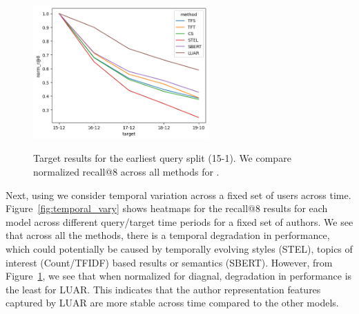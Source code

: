 \begin{figure}
    \centering
    \includegraphics[width=0.6\textwidth,alt={Line plot showing normalized decay across methods.}]{stylometryExtensions/figures/luar_degradation.png}
    \caption{Target results for the earliest query split (15-1). We compare normalized recall@8 across all methods for \DSvarydelta{}.}
    \label{fig:temporal_vary:line}
\end{figure}

Next, using \DSvarydelta{} we consider temporal variation across a fixed set of users across time.
Figure~\ref{fig:temporal_vary} shows heatmaps for the recall@8 results for each model across different query/target time periods for a fixed set of authors.
We see that across all the methods, there is a temporal degradation in performance, which could potentially be caused by temporally evolving styles (STEL), topics of interest (Count/TFIDF) based results or semantics (SBERT).
However, from Figure~\ref{fig:temporal_vary:line}, we see that when normalized for diagnal, degradation in performance is the least for LUAR.
This indicates that the author representation features captured by LUAR are more stable across time compared to the other models.

